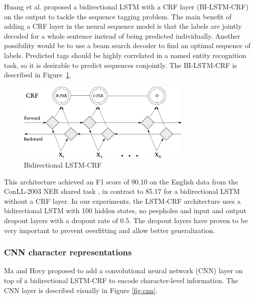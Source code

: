 \documentclass{nle}
\begin{document}
Huang et al. \cite{Huang2015} proposed a bidirectional LSTM with a CRF layer (BI-LSTM-CRF) on 
the output to tackle the sequence tagging problem. The main benefit of adding a CRF layer 
in the neural sequence model is that the labels are jointly decoded for a whole sentence 
instead of being predicted individually. Another possibility would be to use a beam search
decoder to find an optimal sequence of labels. Predicted tags should be highly correlated 
in a named entity recognition task, so it is desirable to predict sequences conjointly.
The BI-LSTM-CRF is described in Figure~\ref{fig:bi_lstm_crf}.

\begin{figure}[h]
  \centering
  \includegraphics[width=0.75\textwidth]{pics/bi_lstm_crf}
  \caption{Bidirectional LSTM-CRF}
  \label{fig:bi_lstm_crf}
\end{figure}

This architecture achieved an F1 score of 90.10 on the English data from the ConLL-2003 
NER shared task \cite{Sang2003}, in contrast to 85.17 for a bidirectional LSTM without 
a CRF layer. 
In our experiments, the LSTM-CRF architecture uses a bidirectional LSTM with 100 
hidden states, no peepholes and input and output dropout layers with a dropout
rate of 0.5. The dropout layers have proven to be very important to prevent overfitting 
and allow better generalization.

\subsubsection{CNN character representations}
\label{sssec:lstm_crf_cnn}

Ma and Hovy \cite{Ma2016} proposed to add a convolutional neural network (CNN) layer 
on top of a bidirectional LSTM-CRF to encode character-level information. The CNN
layer is described visually in Figure \ref{fig:cnn}.
\end{document}

